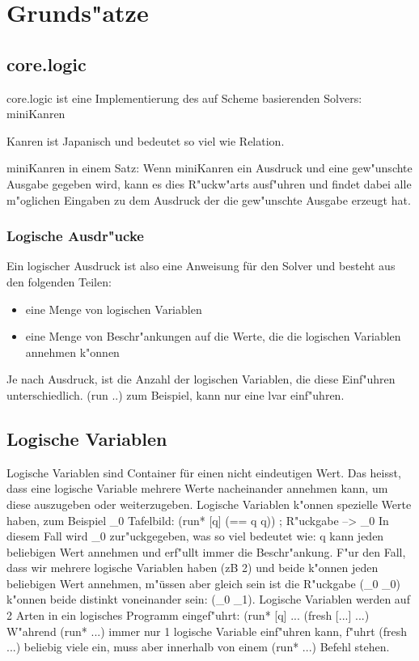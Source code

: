 \section{Grunds"atze}

\subsection{core.logic}

core.logic ist eine Implementierung des auf Scheme basierenden Solvers: miniKanren

Kanren ist Japanisch und bedeutet so viel wie Relation.

miniKanren in einem Satz: Wenn miniKanren ein Ausdruck und eine gew"unschte Ausgabe gegeben wird, kann es dies \dq{} R"uckw"arts \dq{} ausf"uhren und findet dabei alle m"oglichen Eingaben zu dem Ausdruck der die gew"unschte Ausgabe erzeugt hat.

\subsubsection{Logische Ausdr"ucke}

Ein logischer Ausdruck ist also eine Anweisung für den Solver und besteht aus den folgenden Teilen:
\begin{itemize}

\item eine Menge von logischen Variablen

\item eine Menge von Beschr"ankungen auf die Werte, die die logischen Variablen annehmen k"onnen

\end{itemize}

Je nach Ausdruck, ist die Anzahl der logischen Variablen, die diese Einf"uhren unterschiedlich. (run ..) zum Beispiel, kann nur eine lvar einf"uhren.


\subsection{Logische Variablen}
Logische Variablen sind Container für einen nicht eindeutigen Wert. Das heiss{}t, dass eine logische Variable mehrere Werte nacheinander annehmen kann, um diese auszugeben oder weiterzugeben.
Logische Variablen k"onnen spezielle Werte haben, zum Beispiel \_0 
Tafelbild: (run* [q] (== q q)) ; R"uckgabe --> \_0
In diesem Fall wird \_0 zur"uckgegeben, was so viel bedeutet wie: q kann jeden beliebigen Wert annehmen und erf"ullt immer die Beschr"ankung.
F"ur den Fall, dass wir mehrere logische Variablen haben (zB 2) und beide k"onnen jeden beliebigen Wert annehmen, m"üssen aber gleich sein ist die R"uckgabe (\_0 \_0) k"onnen beide distinkt voneinander sein: (\_0 \_1).
Logische Variablen werden auf 2 Arten in ein logisches Programm eingef"uhrt:
(run* [q] ...
(fresh [...] ...)
W"ahrend (run* ...) immer nur 1 logische Variable einf"uhren kann, f"uhrt (fresh ...) beliebig viele ein, muss aber innerhalb von einem (run* ...) Befehl stehen.

